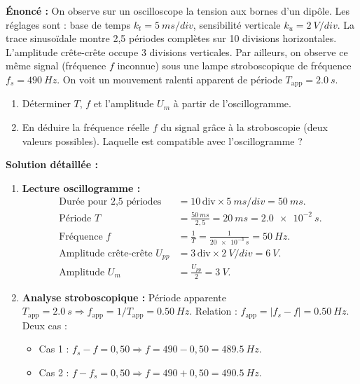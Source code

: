 \documentclass[11pt]{article}
\begin{document}
\begin{exoresolu}
\textbf{Énoncé :} On observe sur un oscilloscope la tension aux bornes d'un dipôle. Les réglages sont : base de temps $k_t = \SI{5}{ms/div}$, sensibilité verticale $k_u = \SI{2}{V/div}$. La trace sinusoïdale montre 2,5 périodes complètes sur 10 divisions horizontales. L'amplitude crête-crête occupe 3 divisions verticales.
Par ailleurs, on observe ce même signal (fréquence $f$ inconnue) sous une lampe stroboscopique de fréquence $f_s = \SI{490}{Hz}$. On voit un mouvement ralenti apparent de période $T_{\text{app}} = \SI{2,0}{s}$.
\begin{enumerate}
    \item Déterminer $T$, $f$ et l'amplitude $U_m$ à partir de l'oscillogramme.
    \item En déduire la fréquence réelle $f$ du signal grâce à la stroboscopie (deux valeurs possibles). Laquelle est compatible avec l'oscillogramme ?
\end{enumerate}
\tcblower
\textbf{Solution détaillée :}
\begin{enumerate}
    \item \textbf{Lecture oscillogramme :}
    \begin{align*}
        \text{Durée pour 2,5 périodes} &= 10\,\text{div} \times \SI{5}{ms/div} = \SI{50}{ms}. \\
        \text{Période } T &= \frac{\SI{50}{ms}}{2,5} = \SI{20}{ms} = \SI{2,0e-2}{s}. \\
        \text{Fréquence } f &= \frac{1}{T} = \frac{1}{\SI{20e-3}{s}} = \SI{50}{Hz}. \\
        \text{Amplitude crête-crête } U_{pp} &= 3\,\text{div} \times \SI{2}{V/div} = \SI{6}{V}. \\
        \text{Amplitude } U_m &= \frac{U_{pp}}{2} = \SI{3}{V}.
    \end{align*}
    \item \textbf{Analyse stroboscopique :}
    Période apparente $T_{\text{app}} = \SI{2,0}{s} \Rightarrow f_{\text{app}} = 1/T_{\text{app}} = \SI{0,50}{Hz}$.
    Relation : $f_{\text{app}} = |f_s - f| = \SI{0,50}{Hz}$.
    Deux cas :
    \begin{itemize}
        \item Cas 1 : $f_s - f = 0,50 \Rightarrow f = 490 - 0,50 = \SI{489,5}{Hz}$.
        \item Cas 2 : $f - f_s = 0,50 \Rightarrow f = 490 + 0,50 = \SI{490,5}{Hz}$.
    \end{itemize}

\end{enumerate}
\end{exoresolu}
\end{document}
